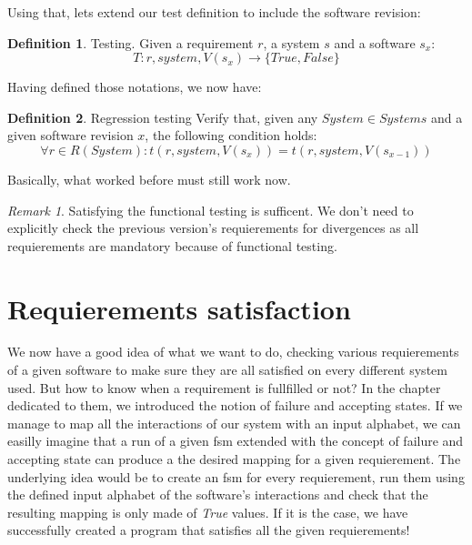 \documentclass[12pt]{article}
\theoremstyle{definition}
\newtheorem{definition}{Definition}[section]
\theoremstyle{definition}
\theoremstyle{remark}
\newtheorem{remark}{Remark}[section]
\begin{document}
Using that, lets extend our test definition to include the software revision:
\theoremstyle{definition}
\begin{definition}{Testing.} Given a requirement $r$, a system $s$ and a software $s_x$:
$$T: r, system,V(s_x) \to \{True, False\}$$
\end{definition}

Having defined those notations, we now have:

\theoremstyle{definition}
\begin{definition}{Regression testing} Verify that, given any $System \in Systems$ and a given software revision $x$, the following condition holds:
$$
\forall r \in R(System): t(r, system, V(s_x)) = t(r, system, V(s_{x-1}))
$$
\end{definition}

Basically, what worked before must still work now.

\theoremstyle{remark}
\begin{remark} Satisfying the functional testing is sufficent. We don't need to explicitly check the previous version's requierements for divergences as all requierements are mandatory because of functional testing.
\end{remark}



\section{Requierements satisfaction}


We now have a good idea of what we want to do, checking various requierements of a given software to make sure they are all satisfied on every different system used. But how to know when a requirement is fullfilled or not? In the chapter dedicated to them, we introduced the notion of failure and accepting states. If we manage to map all the interactions of our system with an input alphabet, we can easilly imagine that a run of a given \gls{fsm} extended with the concept of failure and accepting state can produce a the desired mapping for a given requierement. The underlying idea would be to create an \gls{fsm} for every requierement, run them using the defined input alphabet of the software's interactions and check that the resulting mapping is only made of \textit{True} values. If it is the case, we have successfully created a program that satisfies all the given requierements!
\end{document}
